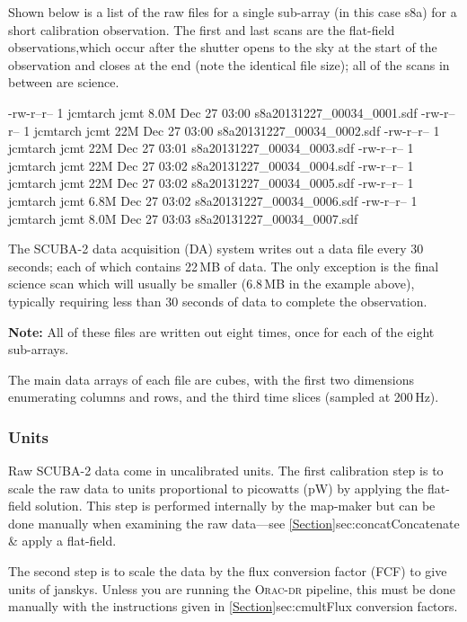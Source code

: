 \documentclass[11pt,oneside,chapters]{starlink}
\begin{document}
Shown below is a list of the raw files for a single sub-array (in this
case s8a) for a short calibration observation. The first and last
scans are the flat-field observations,which occur after the shutter
opens to the sky at the start of the observation and closes at the end
(note the identical file size); all of the scans in between are
science.


\begin{terminalv}
\end{terminalv}

\begin{terminalv}
-rw-r--r-- 1 jcmtarch jcmt 8.0M Dec 27 03:00 s8a20131227_00034_0001.sdf
-rw-r--r-- 1 jcmtarch jcmt  22M Dec 27 03:00 s8a20131227_00034_0002.sdf
-rw-r--r-- 1 jcmtarch jcmt  22M Dec 27 03:01 s8a20131227_00034_0003.sdf
-rw-r--r-- 1 jcmtarch jcmt  22M Dec 27 03:02 s8a20131227_00034_0004.sdf
-rw-r--r-- 1 jcmtarch jcmt  22M Dec 27 03:02 s8a20131227_00034_0005.sdf
-rw-r--r-- 1 jcmtarch jcmt 6.8M Dec 27 03:02 s8a20131227_00034_0006.sdf
-rw-r--r-- 1 jcmtarch jcmt 8.0M Dec 27 03:03 s8a20131227_00034_0007.sdf
\end{terminalv}

The SCUBA-2 data acquisition (DA) system writes out a data file every
30 seconds; each of which contains 22\,MB of data. The only exception
is the final science scan which will usually be smaller (6.8\,MB in
the example above), typically requiring less than 30 seconds of data
to complete the observation.

\textbf{Note:} All of these files are written out eight times, once
for each of the eight sub-arrays.

The main data arrays of each file are cubes, with the first two
dimensions enumerating columns and rows, and the third time slices
(sampled at 200\,Hz).

\subsubsection{Units}

Raw SCUBA-2 data come in uncalibrated units. The first calibration
step is to scale the raw data to units proportional to picowatts (pW)
by applying the flat-field solution. This step is performed internally
by the map-maker but can be done manually when examining the raw
data---see \cref{Section}{sec:concat}{Concatenate \& apply a
  flat-field}.

The second step is to scale the data by the flux conversion factor
(FCF) to give units of janskys. Unless you are running the
\textsc{Orac-dr} pipeline, this must be done manually with the
instructions given in \cref{Section}{sec:cmult}{Flux conversion
  factors}.
\end{document}
